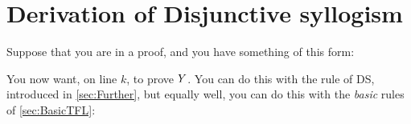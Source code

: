 %
%
%

\section{Derivation of Disjunctive syllogism}
Suppose that you are in a proof, and you have something of this form:
\begin{fitchproof}
\end{fitchproof}
You now want, on line $k$, to prove $Y$. You can do this with the rule of DS, introduced in \cref{sec:Further}, but equally well, you can do this with the \emph{basic} rules of \cref{sec:BasicTFL}:
	\begin{fitchproof}
		\open
			\open
			\close
		\close
		\open
		\close
\end{fitchproof}

